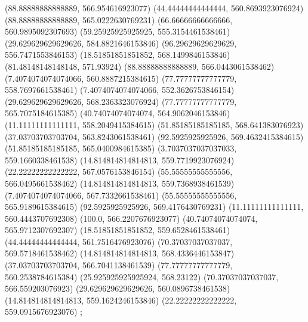 {{{		(88.88888888888889, 566.954616923077)
		(44.44444444444444, 560.8693923076924)
		(88.88888888888889, 565.0222630769231)
		(66.66666666666666, 560.9895092307693)
		(59.25925925925925, 555.3154461538461)
		(29.629629629629626, 584.8821646153846)
		(96.29629629629629, 556.7471553846153)
		(18.51851851851852, 568.1499846153846)
		(81.48148148148148, 571.93924)
		(88.88888888888889, 566.0443061538462)
		(7.4074074074074066, 560.8887215384615)
		(77.77777777777779, 558.7697661538461)
		(7.4074074074074066, 552.3626753846154)
		(29.629629629629626, 568.2363323076924)
		(77.77777777777779, 565.7075184615385)
		(40.74074074074074, 564.9062046153846)
		(11.11111111111111, 558.2049415384615)
		(51.85185185185185, 568.641383076923)
		(37.03703703703704, 563.8243061538461)
		(92.5925925925926, 569.4632415384615)
		(51.85185185185185, 565.0400984615385)
		(3.7037037037037033, 559.1660338461538)
		(14.814814814814813, 559.7719923076924)
		(22.22222222222222, 567.0576153846154)
		(55.55555555555556, 566.0495661538462)
		(14.814814814814813, 559.7368938461539)
		(7.4074074074074066, 567.7332661538461)
		(55.55555555555556, 565.9189615384615)
		(92.5925925925926, 569.4176430769231)
		(11.11111111111111, 560.4443707692308)
		(100.0, 566.2207676923077)
		(40.74074074074074, 565.9712307692307)
		(18.51851851851852, 559.6528461538461)
		(44.44444444444444, 561.7516476923076)
		(70.37037037037037, 569.5718461538462)
		(14.814814814814813, 568.4336446153847)
		(37.03703703703704, 566.7041138461539)
		(77.77777777777779, 560.2538784615384)
		(25.925925925925924, 568.23122)
		(70.37037037037037, 566.559203076923)
		(29.629629629629626, 560.0896738461538)
		(14.814814814814813, 559.1624246153846)
		(22.22222222222222, 559.0915676923076)
	};

}}

